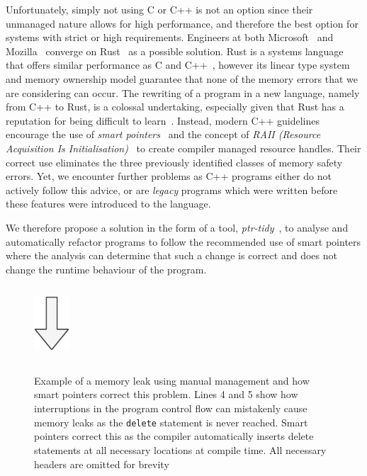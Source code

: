 \documentclass{mpaper}
\begin{document}
    
    Unfortunately, simply not using C or C++ is not an option since their unmanaged nature allows for high performance, and therefore the best option for systems with strict or high requirements.
    Engineers at both Microsoft~\cite{Thomas2019} and Mozilla~\cite{Hostfelt2019} converge on Rust~\cite{Balasubramanian2017} as a possible solution.
    Rust is a systems language that offers similar performance as C and C++~\cite{Lin2016}, however its linear type system and memory ownership model guarantee that none of the memory errors that we are considering can occur.
    The rewriting of a program in a new language, namely from C++ to Rust, is a colossal undertaking, especially given that Rust has a reputation for being difficult to learn~\cite{Astrauskas2019}.
    Instead, modern C++ guidelines encourage the use of \emph{smart pointers}~\cite{Dimov2003} and the concept of \emph{RAII (Resource Acquisition Is Initialisation)}~\cite{Stroustrup2000} to create compiler managed resource handles.
    Their correct use eliminates the three previously identified classes of memory safety errors.
    Yet, we encounter further problems as C++ programs either do not actively follow this advice, or are \emph{legacy} programs which were written before these features were introduced to the language.
    
    We therefore propose a solution in the form of a tool, \emph{ptr-tidy}~\cite{Usov2021}, to analyse and automatically refactor programs to follow the recommended use of smart pointers where the analysis can determine that such a change is correct and does not change the runtime behaviour of the program. 
    
    \begin{figure}
        \centering
        \inputminted{c++}{code/leak.cpp}
        \includegraphics{images/arrow.pdf}
        \inputminted{c++}{code/fix-leak.cpp}
        \caption{Example of a memory leak using manual management and how smart pointers correct this problem. Lines 4 and 5 show how interruptions in the program control flow can mistakenly cause memory leaks as the \texttt{delete} statement is never reached. Smart pointers correct this as the compiler automatically inserts delete statements at all necessary locations at compile time. All necessary headers are omitted for brevity}
        \label{lst:motivating-example}
    \end{figure}
    
\end{document}
